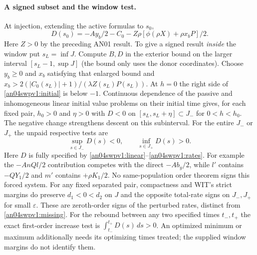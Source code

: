 \documentclass[11pt]{article}
\begin{document}
\paragraph{A signed subset and the window test.}
At injection, extending the active formulas to $s_0$,
\begin{equation}\label{an04swpv1:initial}
 D(s_0)=-Ay_b/2-C_0-Z\rho[\phi(\rho X)+\rho x_bP]/2 .
\end{equation}
Here $Z>0$ by the preceding AN01 result. To give a signed result
\emph{inside} the window put $s_L=\inf J$. Compute $B,D$ in the
exterior bound on the larger interval $[s_L-1,\sup J]$ (the bound only
uses the donor coordinates). Choose $y_b\ge0$ and $x_b$ satisfying
that enlarged bound and
$x_b>2(|C_0(s_L)|+1)/(\lambda Z(s_L)P(s_L))$.
At $h=0$ the right side of \eqref{an04swpv1:initial} is below $-1$.
Continuous dependence of the passive and inhomogeneous linear initial
value problems on their initial time gives, for each fixed pair,
$h_0>0$ and $\eta>0$ with $D<0$ on
$[s_L,s_L+\eta]\subset J_-$ for $0<h<h_0$.
The negative change strengthens descent on this subinterval.
For the entire $J_-$ or $J_+$ the unpaid respective tests are
\begin{equation}\label{an04swpv1:missing}
 \sup_{s\in J_-}D(s)<0,\qquad \inf_{s\in J_+}D(s)>0 .
\end{equation}
Here $D$ is fully specified by \eqref{an04swpv1:linear}--\eqref{an04swpv1:rates}.
For example the $-A nQl/2$ contribution competes with the direct
$-A b_y/2$, while $l'$ contains $-QY_1/2$ and $m'$ contains
$+\rho K_1/2$. No same-population order theorem signs this forced
system. For any fixed separated pair, compactness and WIT's strict
margins do preserve $d_1<0<d_2$ on $J$ and the opposite total-rate
signs on $J_-,J_+$ for small $\varepsilon$. These are zeroth-order
signs of the perturbed rates, distinct from \eqref{an04swpv1:missing}.
For the rebound between any two specified times $t_-,t_+$ the exact
first-order increase test is $\int_{t_-}^{t_+}D(s)\,ds>0$.
An optimized minimum or maximum additionally needs its optimizing
times treated; the supplied window margins do not identify them.
\end{document}
